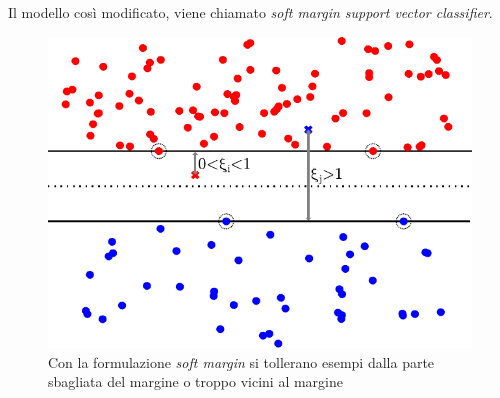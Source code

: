 Il modello così modificato, viene chiamato \emph{soft margin support vector classifier}.
\begin{figure}[ht]
    \centering
    \includegraphics[width=.7\linewidth]{img/soft_margin.pdf}
    \caption{Con la formulazione \emph{soft margin} si tollerano esempi dalla parte sbagliata del margine o troppo vicini al margine}
    \label{fig:soft_margin}
\end{figure}



